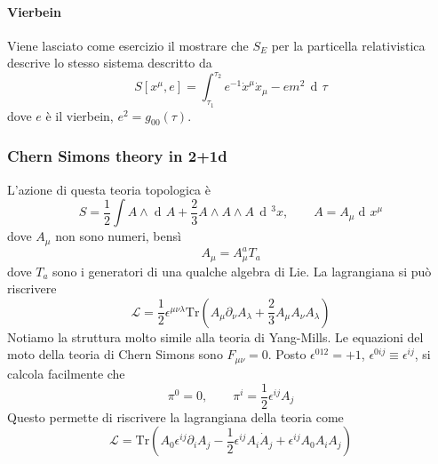 \documentclass[a4paper, 11pt]{article}
\newcommand{\dd}{\mathop{\mathrm{d}\!}{}}
\begin{document}
	\paragraph{Vierbein}
	Viene lasciato come esercizio il mostrare che $S_E$ per la particella relativistica descrive lo stesso sistema descritto da
	\begin{equation*}
	S[x^\mu, e] = \int_{\tau_1}^{\tau_2} e^{-1} \dot{x}^\mu \dot{x}_\mu - e m^2\, \dd \tau
	\end{equation*}
	dove $e$ è il vierbein, $e^2 = g_{00}(\tau)$.
	
	\subsubsection{Chern Simons theory in 2+1d}
	L'azione di questa teoria topologica è
	\begin{equation*}
	S = \dfrac{1}{2} \int A \wedge \dd A + \frac{2}{3} A\wedge A\wedge A\, \dd^3 x,\qquad A = A_\mu \dd x^\mu
	\end{equation*}
	dove $A_\mu$ non sono numeri, bensì
	\begin{equation*}
	A_\mu = A_\mu^a  T_a
	\end{equation*}
	dove $T_a$ sono i generatori di una qualche algebra di Lie. La lagrangiana si può riscrivere
	\begin{equation*}
	\mathcal{L} = \dfrac{1}{2} \epsilon^{\mu\nu\lambda} \mathrm{Tr} (A_\mu \partial_\nu A_\lambda + \frac{2}{3} A_\mu A_\nu A_\lambda) 
	\end{equation*}
	Notiamo la struttura molto simile alla teoria di Yang-Mills.
	Le equazioni del moto della teoria di Chern Simons sono $F_{\mu\nu} = 0$. Posto $\epsilon^{012} = +1$, $\epsilon^{0ij} \equiv \epsilon^{ij}$, si calcola facilmente che
	\begin{equation*}
	\pi^0 = 0,\qquad \pi^i = \frac{1}{2} \epsilon^{ij} A_j
	\end{equation*}
	Questo permette di riscrivere la lagrangiana della teoria come
	\begin{equation*}
	\mathcal{L} = \mathrm{Tr} \left( A_0 \epsilon^{ij} \partial_i A_j - \frac{1}{2} \epsilon^{ij} A_i \dot{A}_j + \epsilon^{ij} A_0 A_i A_j \right)
	\end{equation*}
	
\end{document}

